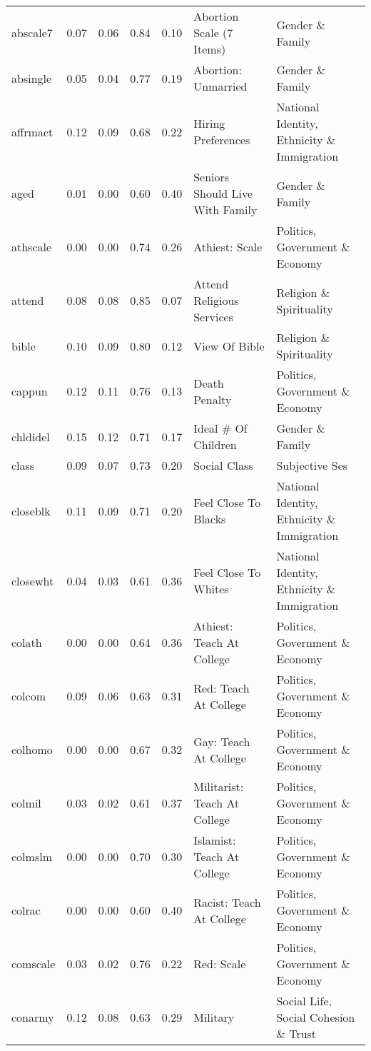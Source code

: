 \begin{longtable}{l|rrrrll}
abscale7 & 0.07 & 0.06 & 0.84 & 0.10 & Abortion Scale (7 Items) & Gender \& Family \\ 
absingle & 0.05 & 0.04 & 0.77 & 0.19 & Abortion: Unmarried & Gender \& Family \\ 
affrmact & 0.12 & 0.09 & 0.68 & 0.22 & Hiring Preferences & National Identity, Ethnicity \& Immigration \\ 
aged & 0.01 & 0.00 & 0.60 & 0.40 & Seniors Should Live With Family & Gender \& Family \\ 
athscale & 0.00 & 0.00 & 0.74 & 0.26 & Athiest: Scale & Politics, Government \& Economy \\ 
attend & 0.08 & 0.08 & 0.85 & 0.07 & Attend Religious Services & Religion \& Spirituality \\ 
bible & 0.10 & 0.09 & 0.80 & 0.12 & View Of Bible & Religion \& Spirituality \\ 
cappun & 0.12 & 0.11 & 0.76 & 0.13 & Death Penalty & Politics, Government \& Economy \\ 
chldidel & 0.15 & 0.12 & 0.71 & 0.17 & Ideal \# Of Children & Gender \& Family \\ 
class & 0.09 & 0.07 & 0.73 & 0.20 & Social Class & Subjective Ses \\ 
closeblk & 0.11 & 0.09 & 0.71 & 0.20 & Feel Close To Blacks & National Identity, Ethnicity \& Immigration \\ 
closewht & 0.04 & 0.03 & 0.61 & 0.36 & Feel Close To Whites & National Identity, Ethnicity \& Immigration \\ 
colath & 0.00 & 0.00 & 0.64 & 0.36 & Athiest: Teach At College & Politics, Government \& Economy \\ 
colcom & 0.09 & 0.06 & 0.63 & 0.31 & Red: Teach At College & Politics, Government \& Economy \\ 
colhomo & 0.00 & 0.00 & 0.67 & 0.32 & Gay: Teach At College & Politics, Government \& Economy \\ 
colmil & 0.03 & 0.02 & 0.61 & 0.37 & Militarist: Teach At College & Politics, Government \& Economy \\ 
colmslm & 0.00 & 0.00 & 0.70 & 0.30 & Islamist: Teach At College & Politics, Government \& Economy \\ 
colrac & 0.00 & 0.00 & 0.60 & 0.40 & Racist: Teach At College & Politics, Government \& Economy \\ 
comscale & 0.03 & 0.02 & 0.76 & 0.22 & Red: Scale & Politics, Government \& Economy \\ 
conarmy & 0.12 & 0.08 & 0.63 & 0.29 & Military & Social Life, Social Cohesion \& Trust \\ 

\end{longtable}
